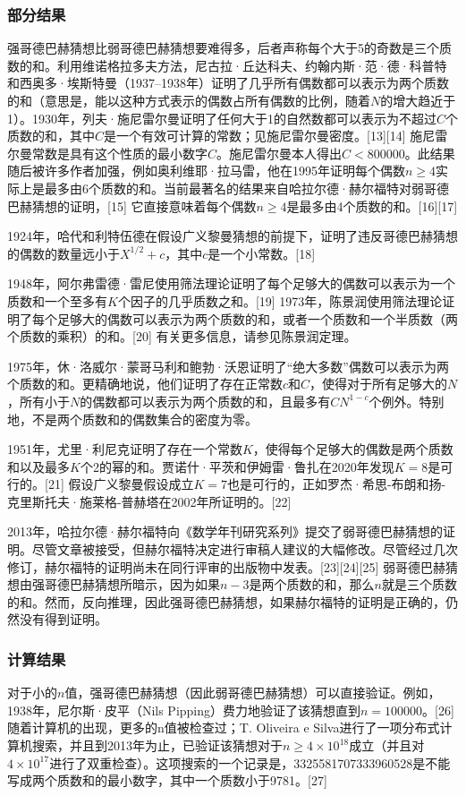 \subsubsection{部分结果}  
强哥德巴赫猜想比弱哥德巴赫猜想要难得多，后者声称每个大于5的奇数是三个质数的和。利用维诺格拉多夫方法，尼古拉·丘达科夫、约翰内斯·范·德·科普特和西奥多·埃斯特曼（1937–1938年）证明了几乎所有偶数都可以表示为两个质数的和（意思是，能以这种方式表示的偶数占所有偶数的比例，随着\(N\)的增大趋近于1）。1930年，列夫·施尼雷尔曼证明了任何大于1的自然数都可以表示为不超过\(C\)个质数的和，其中\(C\)是一个有效可计算的常数；见施尼雷尔曼密度。[13][14] 施尼雷尔曼常数是具有这个性质的最小数字\(C\)。施尼雷尔曼本人得出\(C < 800000\)。此结果随后被许多作者加强，例如奥利维耶·拉马雷，他在1995年证明每个偶数\(n\ge4\)实际上是最多由6个质数的和。当前最著名的结果来自哈拉尔德·赫尔福特对弱哥德巴赫猜想的证明，[15] 它直接意味着每个偶数\(n\ge4\)是最多由4个质数的和。[16][17]

1924年，哈代和利特伍德在假设广义黎曼猜想的前提下，证明了违反哥德巴赫猜想的偶数的数量远小于\(X^{1/2}+ c\)，其中\(c\)是一个小常数。[18]

1948年，阿尔弗雷德·雷尼使用筛法理论证明了每个足够大的偶数可以表示为一个质数和一个至多有\(K\)个因子的几乎质数之和。[19] 1973年，陈景润使用筛法理论证明了每个足够大的偶数可以表示为两个质数的和，或者一个质数和一个半质数（两个质数的乘积）的和。[20] 有关更多信息，请参见陈景润定理。

1975年，休·洛威尔·蒙哥马利和鲍勃·沃恩证明了“绝大多数”偶数可以表示为两个质数的和。更精确地说，他们证明了存在正常数\(c\)和\(C\)，使得对于所有足够大的\(N\)，所有小于\(N\)的偶数都可以表示为两个质数的和，且最多有\(CN^{1-c}\)个例外。特别地，不是两个质数和的偶数集合的密度为零。

1951年，尤里·利尼克证明了存在一个常数\(K\)，使得每个足够大的偶数是两个质数和以及最多\(K\)个2的幂的和。贾诺什·平茨和伊姆雷·鲁扎在2020年发现\(K = 8\)是可行的。[21] 假设广义黎曼假设成立\(K = 7\)也是可行的，正如罗杰·希思-布朗和扬-克里斯托夫·施莱格-普赫塔在2002年所证明的。[22]

2013年，哈拉尔德·赫尔福特向《数学年刊研究系列》提交了弱哥德巴赫猜想的证明。尽管文章被接受，但赫尔福特决定进行审稿人建议的大幅修改。尽管经过几次修订，赫尔福特的证明尚未在同行评审的出版物中发表。[23][24][25] 弱哥德巴赫猜想由强哥德巴赫猜想所暗示，因为如果\(n-3\)是两个质数的和，那么\(n\)就是三个质数的和。然而，反向推理，因此强哥德巴赫猜想，如果赫尔福特的证明是正确的，仍然没有得到证明。
\subsubsection{计算结果}  
对于小的\(n\)值，强哥德巴赫猜想（因此弱哥德巴赫猜想）可以直接验证。例如，1938年，尼尔斯·皮平（Nils Pipping）费力地验证了该猜想直到\(n = 100000\)。[26] 随着计算机的出现，更多的n值被检查过；T. Oliveira e Silva进行了一项分布式计算机搜索，并且到2013年为止，已验证该猜想对于\(n\ge4\times10^{18}\)成立（并且对\(4\times10^{17}\)进行了双重检查）。这项搜索的一个记录是，3325581707333960528是不能写成两个质数和的最小数字，其中一个质数小于9781。[27]